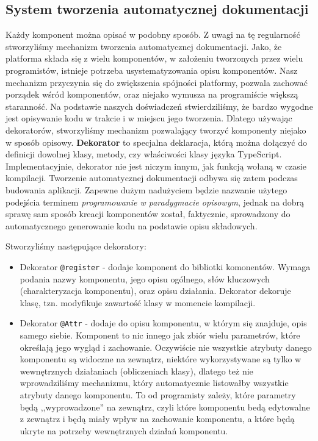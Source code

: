 \documentclass[licencjacka]{pracamgr}
\begin{document}
\subsection{System tworzenia automatycznej dokumentacji}
Każdy komponent można opisać w podobny sposób.
Z uwagi na tę regularność stworzyliśmy mechanizm tworzenia automatycznej dokumentacji.
Jako, że platforma składa się z wielu komponentów, w założeniu tworzonych przez wielu
programistów, istnieje potrzeba usystematyzowania opisu komponentów.
Nasz mechanizm przyczynia się do zwiększenia spójności platformy, pozwala zachować porządek
wśród komponentów, oraz niejako wymusza na programiście większą staranność.
Na podstawie naszych doświadczeń stwierdziliśmy, że bardzo wygodne jest opisywanie
kodu w trakcie i w miejscu jego tworzenia. Dlatego używając dekoratorów,
stworzyliśmy mechanizm pozwalający tworzyć komponenty niejako w sposób opisowy.
\textbf{Dekorator} to specjalna deklaracja, którą można dołączyć do definicji dowolnej klasy, metody, czy właściwości klasy języka TypeScript. Implementacyjnie, dekorator nie jest niczym innym, jak funkcją wołaną w czasie kompilacji. Tworzenie automatycznej dokumentacji odbywa się zatem podczas budowania aplikacji.
Zapewne dużym nadużyciem będzie nazwanie użytego podejścia terminem
\textit{programowanie w paradygmacie opisowym},
jednak na dobrą sprawę sam sposób kreacji komponentów został, faktycznie, sprowadzony do
automatycznego generowanie kodu na podstawie opisu składowych.

Stworzyliśmy następujące dekoratory:
\begin{itemize}
	\item Dekorator \texttt{@register} - dodaje komponent do bibliotki komonentów. Wymaga podania nazwy komponentu,
jego opisu ogólnego, słów kluczowych (charakteryzacja komponentu),
oraz opisu działania. Dekorator dekoruje klasę, tzn. modyfikuje zawartość
klasy w momencie kompilacji.

	\item Dekorator \texttt{@Attr} - dodaje do opisu komponentu, w którym się znajduje, opis samego siebie.
Komponent to nic innego jak zbiór wielu parametrów, które określają jego wygląd i zachowanie.
Oczywiście nie wszystkie atrybuty danego komponentu są widoczne na zewnątrz, niektóre wykorzystywane
są tylko w wewnętrznych działaniach (obliczeniach klasy), dlatego też nie wprowadziliśmy mechanizmu, który
automatycznie listowałby wszystkie atrybuty danego komponentu. To od programisty
zależy, które parametry będą ,,wyprowadzone'' na zewnątrz, czyli które komponentu bedą edytowalne z zewnątrz
i będą miały wpływ na zachowanie komponentu, a które będą ukryte na potrzeby wewnętrznych działań komponentu.
\end{itemize}
\end{document}
